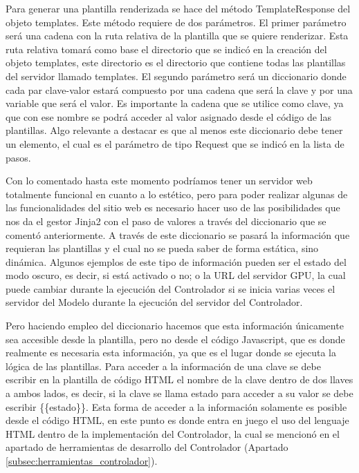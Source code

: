 Para generar una plantilla renderizada se hace del método TemplateResponse del objeto templates. Este método requiere de dos parámetros. El primer parámetro será una cadena con la ruta relativa de la plantilla que se quiere renderizar. Esta ruta relativa tomará como base el directorio que se indicó en la creación del objeto templates, este directorio es el directorio que contiene todas las plantillas del servidor llamado templates. El segundo parámetro será un diccionario donde cada par clave-valor estará compuesto por una cadena que será la clave y por una variable que será el valor. Es importante la cadena que se utilice como clave, ya que con ese nombre se podrá acceder al valor asignado desde el código de las plantillas. Algo relevante a destacar es que al menos este diccionario debe tener un elemento, el cual es el parámetro de tipo Request que se indicó en la lista de pasos.

Con lo comentado hasta este momento podríamos tener un servidor web totalmente funcional en cuanto a lo estético, pero para poder realizar algunas de las funcionalidades del sitio web es necesario hacer uso de las posibilidades que nos da el gestor Jinja2 con el paso de valores a través del diccionario que se comentó anteriormente. A través de este diccionario se pasará la información que requieran las plantillas y el cual no se pueda saber de forma estática, sino dinámica. Algunos ejemplos de este tipo de información pueden ser el estado del modo oscuro, es decir, si está activado o no; o la URL del servidor GPU, la cual puede cambiar durante la ejecución del Controlador si se inicia varias veces el servidor del Modelo durante la ejecución del servidor del Controlador.

Pero haciendo empleo del diccionario hacemos que esta información únicamente sea accesible desde la plantilla, pero no desde el código Javascript, que es donde realmente es necesaria esta información, ya que es el lugar donde se ejecuta la lógica de las plantillas. Para acceder a la información de una clave se debe escribir en la plantilla de código HTML el nombre de la clave dentro de dos llaves a ambos lados, es decir, si la clave se llama estado para acceder a su valor se debe escribir \{\{estado\}\}. Esta forma de acceder a la información solamente es posible desde el código HTML, en este punto es donde entra en juego el uso del lenguaje HTML dentro de la implementación del Controlador, la cual se mencionó en el apartado de herramientas de desarrollo del Controlador (Apartado \ref{subsec:herramientas_controlador}).

